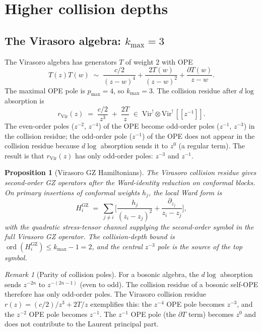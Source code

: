 \documentclass[11pt]{article}
\theoremstyle{plain}
\newtheorem{proposition}[theorem]{Proposition}
\theoremstyle{definition}
\theoremstyle{remark}
\newtheorem{remark}[theorem]{Remark}
\newcommand{\Vir}{\mathrm{Vir}}
\numberwithin{equation}{section}
\begin{document}
\section{Higher collision depths}\label{sec:higher}

\subsection{The Virasoro algebra: $k_{\max} = 3$}

The Virasoro algebra has generators $T$ of weight $2$ with OPE
\[
 T(z)T(w) \;\sim\;
 \frac{c/2}{(z-w)^4}
 + \frac{2T(w)}{(z-w)^2}
 + \frac{\partial T(w)}{z-w}.
\]
The maximal OPE pole is $p_{\max} = 4$, so $k_{\max} = 3$. The
collision residue after $d\log$ absorption is
\begin{equation}\label{eq:vir-collision}
 r_{\Vir}(z)
 \;=\;
 \frac{c/2}{z^3}
 \;+\;
 \frac{2T}{z}
 \;\in\;
 \Vir^! \otimes \Vir^! \, [\![z^{-1}]\!].
\end{equation}
The even-order poles ($z^{-2}$, $z^{-4}$) of the OPE become
odd-order poles ($z^{-1}$, $z^{-3}$) in the collision residue;
the odd-order pole ($z^{-1}$) of the OPE does not appear in the
collision residue because $d\log$ absorption sends it to $z^0$
(a regular term). The result is that $r_{\Vir}(z)$ has only
odd-order poles: $z^{-3}$ and $z^{-1}$.

\begin{proposition}[Virasoro GZ Hamiltonians]
\label{prop:vir-gz-hamiltonians}
The Virasoro collision residue gives second-order GZ operators after
the Ward-identity reduction on conformal blocks. On primary
insertions of conformal weights \(h_j\), the local Ward form is
\begin{equation}\label{eq:vir-gz}
 H_i^{\mathrm{GZ}}
 \;=\;
 \sum_{j \neq i}
 \biggl[
 \frac{h_j}{(z_i - z_j)^2}
 + \frac{\partial_{z_j}}{z_i - z_j}
 \biggr],
\end{equation}
with the quadratic stress-tensor channel supplying the second-order
symbol in the full Virasoro GZ operator. The collision-depth bound is
\(\operatorname{ord}(H_i^{\mathrm{GZ}})\leq k_{\max}-1=2\), and the
central \(z^{-3}\) pole is the source of the top symbol.
\end{proposition}

\begin{remark}[Parity of collision poles]\label{rem:parity}
For a bosonic algebra, the $d\log$ absorption sends
$z^{-2n}$ to $z^{-(2n-1)}$ (even to odd). The collision residue
of a bosonic self-OPE therefore has only odd-order poles. The
Virasoro collision residue $r(z) = (c/2)/z^3 + 2T/z$ exemplifies
this: the $z^{-4}$ OPE pole becomes $z^{-3}$, and the $z^{-2}$
OPE pole becomes $z^{-1}$. The $z^{-1}$ OPE pole (the
$\partial T$ term) becomes $z^0$ and does not contribute to the
Laurent principal part.
\end{remark}
\end{document}
